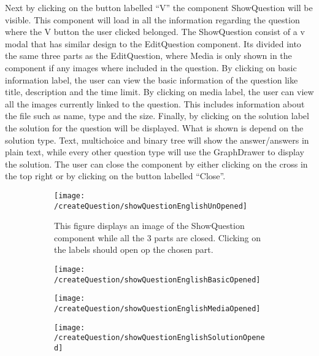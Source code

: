 Next by clicking on the button labelled “V” the component ShowQuestion will be visible. This component will load in all the information regarding the question where the V button the user clicked belonged. The ShowQuestion consist of a v modal that has similar design to the EditQuestion component. Its divided into the same three parts as the EditQuestion, where Media is only shown in the component if any images where included in the question. By clicking on basic information label, the user can view the basic information of the question like title, description and the time limit. By clicking on media label, the user can view all the images currently linked to the question. This includes information about the file such as name, type and the size. Finally, by clicking on the solution label the solution for the question will be displayed. What is shown is depend on the solution type. Text, multichoice and binary tree will show the answer/answers in plain text, while every other question type will use the GraphDrawer to display the solution. The user can close the component by either clicking on the cross in the top right or by clicking on the button labelled “Close”. 
\begin{figure}[H]
	\centering
	\begin{subfigure}{0.80\linewidth}
		\texttt{[image: /createQuestion/showQuestionEnglishUnOpened]}
		\caption{This figure displays an image of the ShowQuestion component while all the 3 parts are closed. Clicking on the labels should open op the chosen part.}
		\label{fig:showQuestionUnOpened}
	\end{subfigure}
	\begin{subfigure}{0.32\linewidth}
		\texttt{[image: /createQuestion/showQuestionEnglishBasicOpened]}
		\caption{}
		\label{fig:showQuestionBasicOpened}
	\end{subfigure}
	\begin{subfigure}{0.32\linewidth}
		\texttt{[image: /createQuestion/showQuestionEnglishMediaOpened]}
		\caption{}
		\label{fig:showQuestionMediaOpened}
	\end{subfigure}
	\begin{subfigure}{0.32\linewidth}
		\texttt{[image: /createQuestion/showQuestionEnglishSolutionOpened]}
		\caption{}
		\label{fig:showQuestionSolutionOpened}
	\end{subfigure}
\end{figure}
